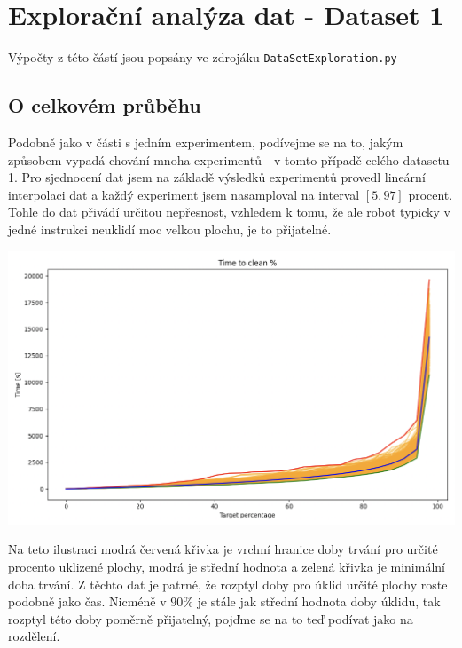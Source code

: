 \documentclass[11pt]{article}
\def\code#1{\texttt{#1}}
\begin{document}
%


\section{Explorační analýza dat - Dataset 1}
Výpočty z této částí jsou popsány ve zdrojáku \code{DataSetExploration.py}
\subsection{O celkovém průběhu}
Podobně jako v části s jedním experimentem, podívejme se na to, jakým způsobem vypadá chování mnoha experimentů - v tomto případě celého datasetu 1. Pro sjednocení dat jsem na základě výsledků experimentů provedl lineární interpolaci dat a každý experiment jsem nasamploval na interval $[5,97]$ procent. Tohle do dat přivádí určitou nepřesnost, vzhledem k tomu, že ale robot typicky v jedné instrukci neuklidí moc velkou plochu, je to přijatelné.
\begin{center}
	\includegraphics[scale=0.4]{Images/PercentageDS1.png}
\end{center}
Na teto ilustraci modrá červená křivka je vrchní hranice doby trvání pro určité procento uklizené plochy, modrá je střední hodnota a zelená křivka je minimální doba trvání. Z těchto dat je patrné, že rozptyl doby pro úklid určité plochy roste podobně jako čas. Nicméně v $90\%$ je stále jak střední hodnota doby úklidu, tak rozptyl této doby poměrně přijatelný, pojďme se na to teď podívat jako na rozdělení.
\end{document}
